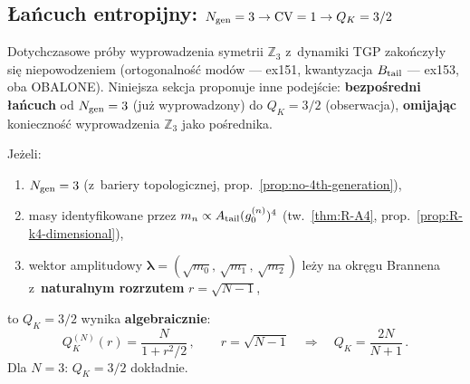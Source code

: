
\subsection{{\L}a\'ncuch entropijny: $N_{\rm gen} = 3 \to \mathrm{CV} = 1 \to Q_K = 3/2$}%
\label{ssec:R2-entropy-chain}

Dotychczasowe pr\'oby wyprowadzenia symetrii $\mathbb{Z}_3$
z~dynamiki TGP zako\'nczy\l{}y si\k{e} niepowodzeniem
(ortogonalno\'s\'c mod\'ow --- ex151, kwantyzacja $B_{\rm tail}$
--- ex153, oba OBALONE). Niniejsza sekcja proponuje inne podej\'scie:
\textbf{bezpo\'sredni \l{}a\'ncuch} od $N_{\rm gen} = 3$
(ju\.z wyprowadzony) do $Q_K = 3/2$ (obserwacja),
\textbf{omijaj\k{a}c} konieczno\'s\'c wyprowadzenia $\mathbb{Z}_3$
jako po\'srednika.

\begin{proposition}[{\L}a\'ncuch entropijny $d = 3 \to Q_K = 3/2$]%
\label{prop:R2-entropy-chain}

\noindent
Je\.zeli:
\begin{enumerate}[(H1)]
  \item $N_{\rm gen} = 3$ (z~bariery topologicznej,
    prop.~\ref{prop:no-4th-generation}),
  \item masy identyfikowane przez $m_n \propto A_{\rm tail}(g_0^{(n)})^4$
    (tw.~\ref{thm:R-A4}, prop.~\ref{prop:R-k4-dimensional}),
  \item wektor amplitudowy $\boldsymbol{\lambda} = (\sqrt{m_0},\,\sqrt{m_1},\,\sqrt{m_2})$
    le\.zy na okr\k{e}gu Brannena z~\textbf{naturalnym rozrzutem}
    $r = \sqrt{N - 1}$,
\end{enumerate}
to $Q_K = 3/2$ wynika \textbf{algebraicznie}:
\begin{equation}\label{eq:R2-QK-from-N}
  Q_K^{(N)}(r) = \frac{N}{1 + r^2/2}\,,
  \qquad
  r = \sqrt{N - 1}
  \quad\Longrightarrow\quad
  Q_K = \frac{2N}{N + 1}\,.
\end{equation}
Dla $N = 3$: $Q_K = 3/2$ dok\l{}adnie.
\end{proposition}


